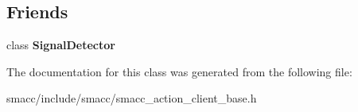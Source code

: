 \subsection*{Friends}
\begin{DoxyCompactItemize}
\item 
class {\bfseries Signal\+Detector}\hypertarget{classsmacc_1_1SmaccActionClientBase_a9fb9044f83e768849d1b42d9d0d5508e}{}\label{classsmacc_1_1SmaccActionClientBase_a9fb9044f83e768849d1b42d9d0d5508e}

\end{DoxyCompactItemize}


The documentation for this class was generated from the following file\+:\begin{DoxyCompactItemize}
\item 
smacc/include/smacc/smacc\+\_\+action\+\_\+client\+\_\+base.\+h\end{DoxyCompactItemize}
